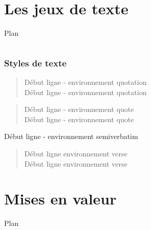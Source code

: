 \documentclass[slidetop,11pt]{beamer}
\begin{document}
\section{Les jeux de texte}
\begin{frame}{Plan}
  \begin{columns}[t]
  \begin{column}{5cm}
  \tableofcontents[sections={1-4},currentsection, hideothersubsections]
  \end{column}
  \begin{column}{5cm}
  \tableofcontents[sections={5-8},currentsection,hideothersubsections]
  \end{column}
  \end{columns}
\end{frame}
\begin{frame}
\frametitle{Styles de texte} 
\begin{quotation}
Début ligne - environnement quotation\\
Début ligne - environnement quotation
\end{quotation}
 
\begin{quote}
Début ligne - environnement quote\\
Début ligne - environnement quote
\end{quote} 
 
\begin{semiverbatim}
Début ligne - environnement semiverbatim
\end{semiverbatim}

 \begin{verse}
Début ligne   environnement verse\\
Début ligne   environnement verse\\
 \end{verse}  
\end{frame}
\section{Mises en valeur}
\begin{frame}{Plan}
  \small {}
\end{frame}
\end{document}
